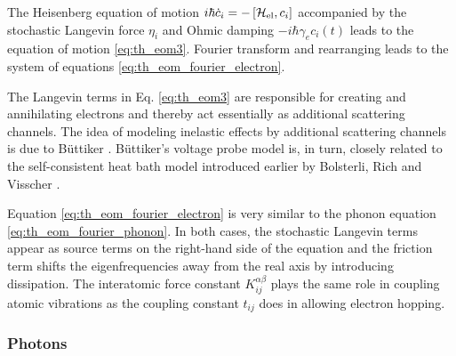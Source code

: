 The Heisenberg equation of motion $i\hbar \dot{c}_i = - \left[\mathcal{H}_{\textrm{el}},c_i \right]$ \cite{ballentine} accompanied by the stochastic Langevin force $\eta_i$ and Ohmic damping $-i\hbar \gamma_e c_i(t)$ \cite{dhar03} leads to the equation of motion \eqref{eq:th_eom3}. Fourier transform and rearranging leads to the system of equations \eqref{eq:th_eom_fourier_electron}. 

The Langevin terms in Eq. \eqref{eq:th_eom3} are responsible for creating and annihilating electrons and thereby act essentially as additional scattering channels. The idea of modeling inelastic effects by additional scattering channels is due to B\"uttiker \cite{buttiker86}. B\"uttiker's voltage probe model is, in turn, closely related to the self-consistent heat bath model introduced earlier by Bolsterli, Rich and Visscher \cite{bolsterli70}.

Equation \eqref{eq:th_eom_fourier_electron} is very similar to the phonon equation \eqref{eq:th_eom_fourier_phonon}. In both cases, the stochastic Langevin terms appear as source terms on the right-hand side of the equation and the friction term shifts the eigenfrequencies away from the real axis by introducing dissipation. The interatomic force constant $K_{ij}^{\alpha\beta}$ plays the same role in coupling atomic vibrations as the coupling constant $t_{ij}$ does in allowing electron hopping. 









\subsubsection{Photons}

